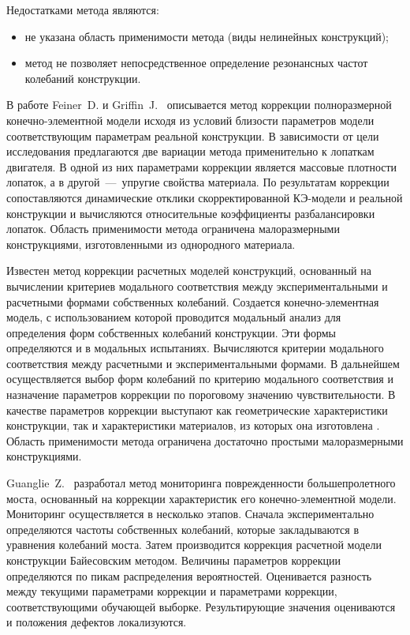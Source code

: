 Недостатками метода являются: 
\begin{itemize}
	\item не указана область применимости метода (виды нелинейных конструкций); 
	\item метод не позволяет непосредственное определение резонансных частот колебаний конструкции. 
\end{itemize}

В работе Feiner~D. и Griffin~J.~\cite{lib:modelUpdating:WO2019209410A1} описывается метод коррекции полноразмерной конечно-элементной модели исходя из условий близости параметров модели соответствующим параметрам реальной конструкции. В зависимости от цели исследования предлагаются две вариации метода применительно к лопаткам двигателя. В одной из них параметрами коррекции является массовые плотности лопаток, а в другой~---~упругие свойства материала. По результатам коррекции сопоставляются динамические отклики скорректированной КЭ-модели и реальной конструкции и вычисляются относительные коэффициенты разбалансировки лопаток. Область применимости метода ограничена малоразмерными конструкциями, изготовленными из однородного материала. 

Известен метод коррекции расчетных моделей конструкций, основанный на вычислении критериев модального соответствия между экспериментальными и расчетными формами собственных колебаний. Создается конечно-элементная модель, с использованием которой проводится модальный анализ для определения форм собственных колебаний конструкции. Эти формы определяются и в модальных испытаниях. Вычисляются критерии модального соответствия между расчетными и экспериментальными формами. В дальнейшем осуществляется выбор форм колебаний по критерию модального соответствия и назначение параметров коррекции по пороговому значению чувствительности. В качестве параметров коррекции выступают как геометрические характеристики конструкции, так и характеристики материалов, из которых она изготовлена \cite{lib:modelUpdating:CN106529055A}. Область применимости метода ограничена достаточно простыми малоразмерными конструкциями.
 
Guanglie~Z.~\cite{lib:modelUpdating:CN107687872A} разработал метод мониторинга поврежденности большепролетного моста, основанный на коррекции характеристик его конечно-элементной модели. Мониторинг осуществляется в несколько этапов. Сначала экспериментально определяются частоты собственных колебаний, которые закладываются в уравнения колебаний моста. Затем производится коррекция расчетной модели конструкции Байесовским методом. Величины параметров коррекции определяются по пикам распределения вероятностей. Оценивается разность между текущими параметрами коррекции и параметрами коррекции, соответствующими обучающей выборке. Результирующие значения оцениваются и положения дефектов локализуются. 

